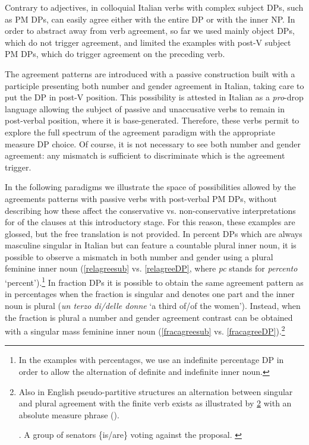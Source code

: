 \documentclass[charis, linguex]{glossa}
\begin{document}
Contrary to adjectives, in colloquial Italian verbs with complex subject DPs, such as PM DPs, can easily agree either with the entire DP or with the inner NP. In order to abstract away from verb agreement, so far we used mainly object DPs, which do not trigger agreement, and limited the examples with post-V subject PM DPs, which do trigger agreement on the preceding verb.

The agreement patterns are introduced with a passive construction built with a participle presenting both number and gender agreement in Italian, taking care to put the DP in post-V position. This possibility is attested in Italian as a \textit{pro}-drop language allowing the subject of passive and unaccusative verbs to remain in post-verbal position, where it is base-generated. Therefore, these verbs permit to explore the full spectrum of the agreement paradigm with the appropriate measure DP choice. Of course, it is not necessary to see both number and gender agreement: any mismatch is sufficient to discriminate which is the agreement trigger. 

In the following paradigms we illustrate the space of possibilities allowed by
the agreements patterns with passive verbs with post-verbal PM DPs, without
describing how these affect the conservative vs. non-conservative
interpretations for of the clauses at this introductory stage. For this
reason, these examples are glossed, but the free translation is not provided.
In percent DPs which are always masculine singular in Italian but can feature a countable plural inner noun, it is possible to observe a mismatch in both number and gender using a plural feminine inner noun (\ref{relagreesub} vs. \ref{relagreeDP}, where \textit{pc} stands for \textit{percento} `percent').\footnote{In the examples with
percentages, we use an indefinite percentage DP in order to allow the
alternation of definite and indefinite inner noun.} In fraction DPs it is
possible to obtain the same agreement pattern as in percentages when the
fraction is singular and denotes one part and the inner noun is plural (\textit{un terzo di/delle donne} `a third of/of the women').
Instead, when the fraction is plural a number and gender agreement contrast can
be obtained with a singular mass feminine inner noun (\ref{fracagreesub} vs.
\ref{fracagreeDP}).\footnote{Also in English pseudo-partitive structures an alternation between singular and plural agreement with the finite verb exists as illustrated by \ref{singplu} with an absolute measure phrase (\citealt[ex.2b]{man19}).

\ex. A group of senators \{is/are\} voting against the proposal. \label{singplu}

}
\end{document}

